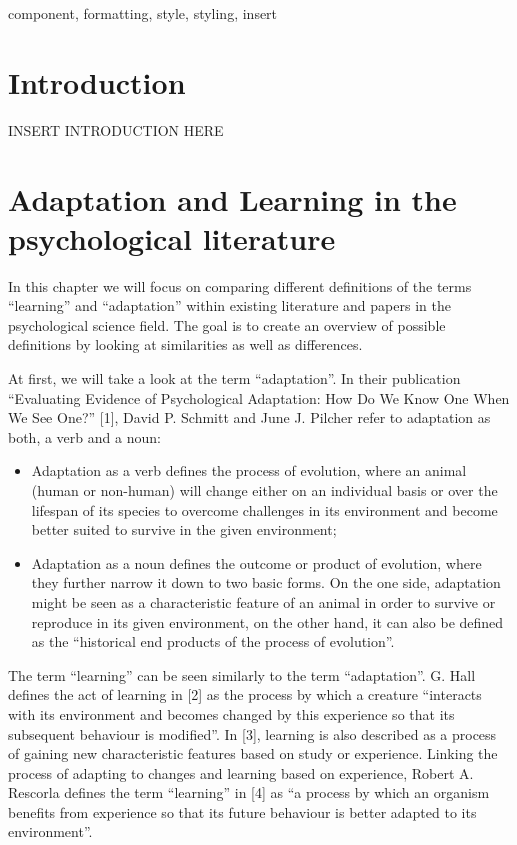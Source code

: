 \documentclass[conference]{IEEEtran}
\begin{document}
\begin{IEEEkeywords}
	component, formatting, style, styling, insert
\end{IEEEkeywords}

\section{Introduction}
	INSERT INTRODUCTION HERE

\section{Adaptation and Learning in the psychological literature}

	In this chapter we will focus on comparing different definitions of the terms “learning” and “adaptation” within existing literature and papers in the psychological science field. The goal is to create an overview of possible definitions by looking at similarities as well as differences.

	At first, we will take a look at the term “adaptation”. In their publication “Evaluating Evidence of Psychological Adaptation: How Do We Know One When We See One?” [1], David P. Schmitt and June J. Pilcher refer to adaptation as both, a verb and a noun:
	\begin{itemize}
		\item Adaptation as a verb defines the process of evolution, where an animal (human or non-human) will change either on an individual basis or over the lifespan of its species to overcome challenges in its environment and become better suited to survive in the given environment;
		\item Adaptation as a noun defines the outcome or product of evolution, where they further narrow it down to two basic forms. On the one side, adaptation might be seen as a characteristic feature of an animal in order to survive or reproduce in its given environment, on the other hand, it can also be defined as the “historical end products of the process of evolution”.
	\end{itemize}

	The term “learning” can be seen similarly to the term “adaptation”. G. Hall defines the act of learning in [2] as the process by which a creature “interacts with its environment and becomes changed by this experience so that its subsequent behaviour is modified”. In [3], learning is also described as a process of gaining new characteristic features based on study or experience. Linking the process of adapting to changes and learning based on experience, Robert A. Rescorla defines the term “learning” in [4] as “a process by which an organism benefits from experience so that its future behaviour is better adapted to its environment”.
\end{document}
